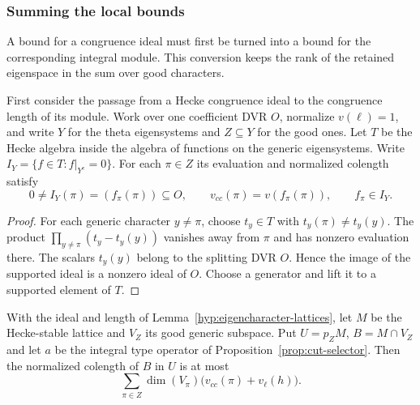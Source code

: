\subsubsection*{Summing the local bounds}
\hypertarget{source-numerator-sums}{}

A bound for a congruence ideal must first be turned into a bound for the corresponding integral module. This conversion keeps the rank of the retained eigenspace in the sum over good characters.

\begin{established}\label{hyp:eigencharacter-lattices}
First consider the passage from a Hecke congruence ideal
to the congruence length of its module. Work over one
coefficient DVR \(O\), normalize \(v(\ell)=1\), and write
\(Y\) for the theta eigensystems and \(Z\subseteq Y\) for
the good ones. Let \(T\) be the Hecke algebra inside the
algebra of functions on the generic eigensystems. Write \(I_Y=\{f\in T:f|_{Y^c}=0\}\). For each \(\pi\in Z\) its evaluation and normalized colength satisfy
\[
 0\ne I_Y(\pi)=(f_\pi(\pi))\subseteq O,\qquad
 v_{cc}(\pi)=v(f_\pi(\pi)),\qquad f_\pi\in I_Y .
\]
\end{established}
\begin{proof}
For each generic character \(y\ne\pi\), choose \(t_y\in T\) with \(t_y(\pi)\ne t_y(y)\). The product \(\prod_{y\ne\pi}(t_y-t_y(y))\) vanishes away from \(\pi\) and has nonzero evaluation there. The scalars \(t_y(y)\) belong to the splitting DVR \(O\). Hence the image of the supported ideal is a nonzero ideal of \(O\). Choose a generator and lift it to a supported element of \(T\).
\end{proof}

\begin{lemma}\label{lem:eigencharacter-colength}
With the ideal and length of Lemma~\ref{hyp:eigencharacter-lattices},
let \(M\) be the Hecke-stable lattice and \(V_Z\) its good generic
subspace. Put \(U=p_ZM\), \(B=M\cap V_Z\)
and let \(a\) be the integral type operator of
Proposition~\ref{prop:cut-selector}. Then the normalized
colength of \(B\) in \(U\) is at most
\[
 \sum_{\pi\in Z}\dim(V_\pi)\bigl(v_{cc}(\pi)+v_\ell(h)\bigr).
\]
\end{lemma}

